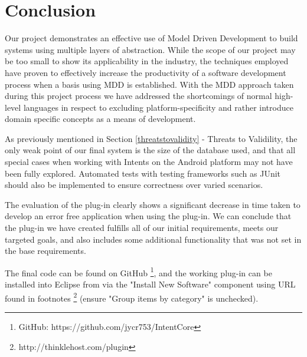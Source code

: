 \section{Conclusion}
\label{conclusion}

Our project demonstrates an effective use of Model Driven Development to build systems using multiple layers of abstraction. While the scope of our project may be too small to show its applicability in the industry, the techniques employed have proven to effectively increase the productivity of a software development process when a basis using MDD is established.
With the MDD approach taken during this project process we have addressed the shortcomings of normal high-level languages in respect to excluding platform-specificity and rather introduce domain specific concepts as a means of development. 

As previously mentioned in Section \ref{threatstovalidity} - Threats to Validility, the only weak point of our final system is the size of the database used, and that all special cases when working with Intents on the Android platform may not have been fully explored. Automated tests with testing frameworks such as JUnit should also be implemented to ensure correctness over varied scenarios.

The evaluation of the plug-in clearly shows a significant decrease in time taken to develop an error free application when using the plug-in. We can conclude that the plug-in we have created fulfills all of our initial requirements, meets our targeted goals, and also includes some additional functionality that was not set in the base requirements.

The final code can be found on GitHub \footnote{GitHub: https://github.com/jycr753/IntentCore}, and the working plug-in can be installed into Eclipse from via the "Install New Software" component using URL found in footnotes \footnote{http://thinklehost.com/plugin} (ensure "Group items by category" is unchecked).


